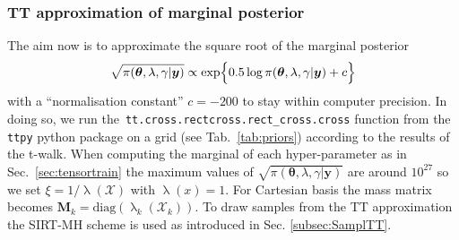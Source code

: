 \subsubsection{TT approximation of marginal posterior}
The aim now is to approximate the square root of the marginal posterior
\begin{align}
	\begin{split}
		\sqrt{\pi( \bm{\theta},\lambda,\gamma  | \bm{y})} \propto  \exp\Bigl\{ 0.5\log{\pi( \bm{\theta},\lambda,\gamma  | \bm{y}) } + c \Bigr\}  
	\end{split} 
	\label{eq:MargPostFullTT}
\end{align}
with a ``normalisation constant'' $c=-200$ to stay within computer precision.
In doing so, we run the~\texttt{tt.cross.rectcross.rect\_cross.cross} function from the \texttt{ttpy} python package \cite{Oseledets2018ttpy} on a grid (see Tab.~\ref{tab:priors}) according to the results of the t-walk.
When computing the marginal of each hyper-parameter as in Sec.~\ref{sec:tensortrain} the maximum values of $\sqrt{\pi( \bm{\theta},\lambda,\gamma  | \bm{y})}$ are around $10^{27}$ so we set $\xi = 1 / \uplambda (\mathcal{X})$ with $\uplambda(x) = 1$.
For Cartesian basis the mass matrix becomes $\bm{M}_k = \text{diag}(\uplambda_k(\mathcal{X}_k))$.
To draw samples from the TT approximation the SIRT-MH scheme is used as introduced in Sec. \ref{subsec:SamplTT}.

